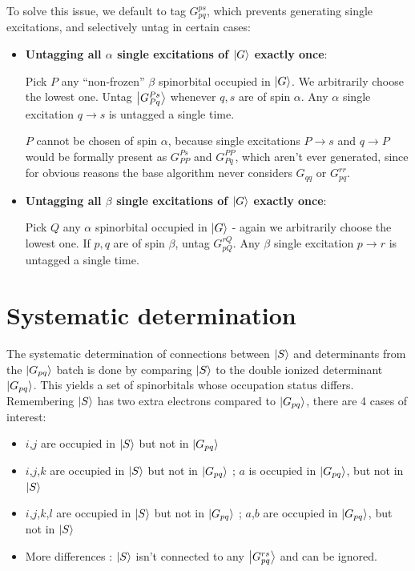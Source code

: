 \documentclass[./thesis.tex]{subfiles}
\begin{document}
To solve this issue, we default to tag $G_{pq}^{ps}$, which prevents generating single excitations, and selectively untag in certain cases:


\begin{itemize}
\item
\textbf{Untagging all $\alpha$ single excitations of $\ket G$ exactly once}:

Pick $P$ any ``non-frozen'' $\beta$ spinorbital occupied in $\ket G$. We arbitrarily choose the lowest one. Untag $\ket {G_{Pq}^{Ps}}$ whenever $q,s$ are of spin $\alpha$. Any $\alpha$ single excitation $q \rightarrow  s$ is untagged a single time.

$P$ cannot be chosen of spin $\alpha$, because single excitations $P \rightarrow  s$ and $q \rightarrow  P$ would be formally present as $G_{PP}^{Ps}$ and $G_{Pq}^{PP}$, which aren't ever generated, since for obvious reasons the base algorithm never considers $G_{qq}$ or $G_{pq}^{rr}$.
\item
\textbf{Untagging all $\beta$ single excitations of $\ket G$ exactly once}:

Pick $Q$ any $\alpha$ spinorbital occupied in $\ket G$ - again we arbitrarily choose the lowest one. If $p,q$ are of spin $\beta$, untag $G_{pQ}^{rQ}$. Any $\beta$ single excitation $p \rightarrow  r$ is untagged a single time.
\end{itemize}


\section{Systematic determination}

The systematic determination of connections between $\ket S$ and determinants from the $\ket {G_{pq}}$ batch is done by comparing $\ket S$ to the double ionized determinant $\ket {G_{pq}}$. This yields a set of spinorbitals whose occupation status differs. Remembering $\ket S$ has two extra electrons compared to $\ket {G_{pq}}$, there are 4 cases of interest:
\begin{itemize}

\item
$i$,$j$ are occupied in $\ket S$ but not in $\ket {G_{pq}}$
\item
$i$,$j$,$k$ are occupied in $\ket S$ but not in $\ket {G_{pq}}$ ; $a$ is occupied in $\ket {G_{pq}}$, but not in $\ket S$
\item
$i$,$j$,$k$,$l$ are occupied in $\ket S$ but not in $\ket {G_{pq}}$ ; $a$,$b$ are occupied in $\ket {G_{pq}}$, but not in $\ket S$
\item
More differences : $\ket S$ isn't connected to any $\ket {G_{pq}^{rs}}$ and can be ignored. 

\end{itemize}
\end{document}
